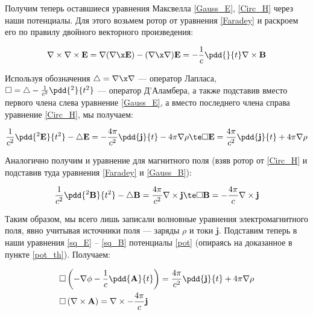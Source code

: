 \documentclass[12pt]{kiarticle}
\begin{document}
Получим теперь оставшиеся уравнения Максвелла \eqref{Gauss_E}, \eqref{Circ_H} через наши потенциалы. Для этого возьмем ротор от уравнения \eqref{Faradey} и раскроем его по правилу двойного векторного произведения:

\begin{equation}\label{}
\nabla \times \nabla \times \mathbf{E} = \nabla (\nabla \x \mathbf{E}) - (\nabla \x \nabla) \mathbf{E} = - \dfrac{1}{c} \pdd{}{t}\nabla \times \mathbf{B}
\end{equation}

Используя обозначения $ \triangle = \nabla \x \nabla $  --- оператор Лапласа, $ \square = \triangle -  \frac{1}{c^2}\pdd{^2}{t^2}$ --- оператор Д'Аламбера, а также подставив вместо первого члена слева уравнение \eqref{Gauss_E}, а вместо последнего члена справа уравнение \eqref{Circ_H}, мы получаем:

\begin{equation}\label{sq_E}
\dfrac{1}{c^2}\pdd{^2\mathbf{E}}{t^2} - \triangle \mathbf{E} = - \dfrac{4\pi}{c^2} \pdd{\mathbf{j}}{t} - 4 \pi \nabla \rho \te \square \mathbf{E} = \dfrac{4\pi}{c^2} \pdd{\mathbf{j}}{t} + 4 \pi \nabla \rho
\end{equation}

Аналогично получим и уравнение для магнитного поля (взяв ротор от \eqref{Circ_H} и подставив туда уравнения \eqref{Faradey} и \eqref{Gauss_B}):

\begin{equation}\label{sq_B}
\dfrac{1}{c^2}\pdd{^2\mathbf{B}}{t^2} - \triangle \mathbf{B} = \dfrac{4\pi}{c^2} \nabla \times \mathbf{j} \te \square \mathbf{B} = - \dfrac{4\pi}{c} \nabla \times \mathbf{j}
\end{equation}

Таким образом, мы всего лишь записали волновные уравнения электромагнитного поля, явно учитывая источники поля --- заряды $ \rho $ и токи $ \mathbf{j} $. Подставим теперь в наши уравнения \eqref{sq_E} -- \eqref{sq_B} потенциалы \eqref{pot} (опираясь на доказанное в пункте \ref{pot_th}). Получаем:

\begin{equation}\label{sq}
\left.
\begin{aligned}
& \square \left( - \nabla \phi  - \dfrac{1}{c} \pdd{\mathbf{A}}{t} \right) = \dfrac{4\pi}{c^2} \pdd{\mathbf{j}}{t} + 4 \pi \nabla \rho \\
& \square \left( \nabla \times \mathbf{A} \right) = \nabla \times - \dfrac{4\pi}{c}\mathbf{j} \\
\end{aligned}
\right.
\end{equation}
\end{document}
